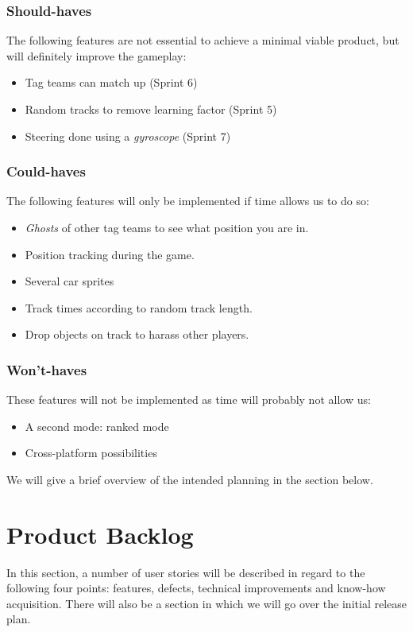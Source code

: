 \documentclass[11pt,twoside,a4paper]{article}
\begin{document}
\subsubsection{Should-haves}
The following features are not essential to achieve a minimal viable product, but will definitely improve the gameplay:
\begin{itemize}
    \item Tag teams can match up (Sprint 6)  
    \item Random tracks to remove learning factor (Sprint 5)
    \item Steering done using a \emph{gyroscope} (Sprint 7)
\end{itemize}
\subsubsection{Could-haves}
The following features will only be implemented if time allows us to do so:
\begin{itemize}
    \item \emph{Ghosts} of other tag teams to see what position you are in.
    \item Position tracking during the game.
    \item Several car sprites
    \item Track times according to random track length.
    \item Drop objects on track to harass other players.
\end{itemize}
\subsubsection{Won't-haves}
These features will not be implemented as time will probably not allow us:
\begin{itemize}
    \item A second mode: ranked mode
    \item Cross-platform possibilities
\end{itemize}
We will give a brief overview of the intended planning in the section below.

\section{Product Backlog}
In this section, a number of user stories will be described in regard to the following four points: features, defects, technical improvements and know-how acquisition. There will also be a section in which we will go over the initial release plan.
\end{document}
